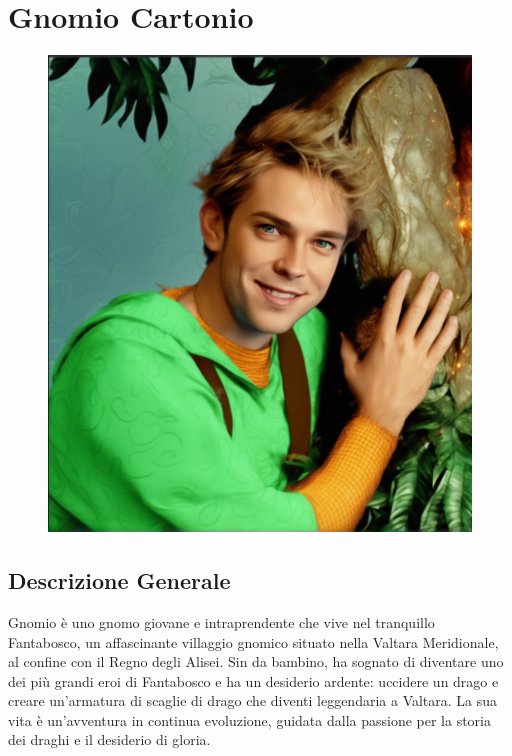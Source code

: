 \section{Gnomio Cartonio}\label{gnomio-cartonio}


\begin{figure}
\centering
\includegraphics{gnomo-epic-royal-background-big-royal-uncropped-crown-royal-jewelry-robotic-nature-full-shot-.png}
\end{figure}

\subsection{Descrizione Generale}\label{descrizione-generale}



Gnomio è uno gnomo giovane e intraprendente che vive nel tranquillo
Fantabosco, un affascinante villaggio gnomico situato nella Valtara
Meridionale, al confine con il Regno degli Alisei. Sin da bambino, ha
sognato di diventare uno dei più grandi eroi di Fantabosco e ha un
desiderio ardente: uccidere un drago e creare un'armatura di scaglie di
drago che diventi leggendaria a Valtara. La sua vita è un'avventura in
continua evoluzione, guidata dalla passione per la storia dei draghi e
il desiderio di gloria.

